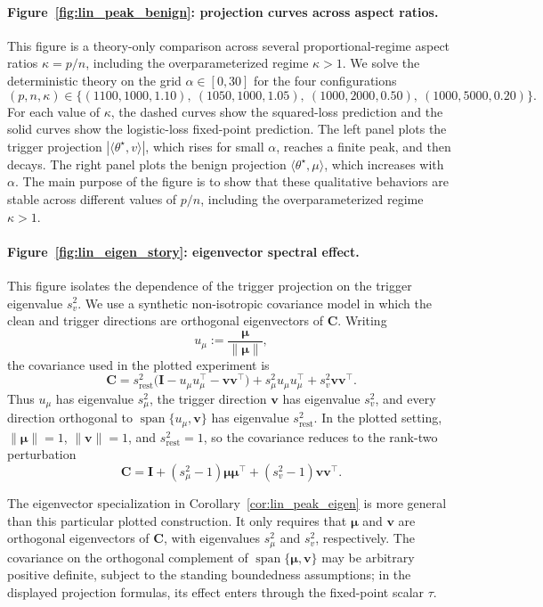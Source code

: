 \documentclass[11pt]{article}
\newcommand{\I}{\mathbf{I}}
\newcommand{\C}{\mathbf{C}}
\newcommand{\bv}{\mathbf{v}}
\newcommand{\bmu}{\boldsymbol{\mu}}
\begin{document}
\paragraph{Figure~\ref{fig:lin_peak_benign}: projection curves across aspect ratios.}
This figure is a theory-only comparison across several proportional-regime
aspect ratios \(\kappa=p/n\), including the overparameterized regime
\(\kappa>1\). We solve the deterministic theory on the grid
\(\alpha\in[0,30]\) for the four configurations
\[
(p,n,\kappa)\in
\{(1100,1000,1.10),\ (1050,1000,1.05),\ (1000,2000,0.50),\
(1000,5000,0.20)\}.
\]
For each value of \(\kappa\), the dashed curves show the squared-loss
prediction and the solid curves show the logistic-loss fixed-point prediction.
The left panel plots the trigger projection
\(|\langle\theta^\star,v\rangle|\), which rises for small \(\alpha\), reaches a
finite peak, and then decays. The right panel plots the benign projection
\(\langle\theta^\star,\mu\rangle\), which increases with \(\alpha\). The main
purpose of the figure is to show that these qualitative behaviors are stable
across different values of \(p/n\), including the overparameterized regime
\(\kappa>1\).

\paragraph{Figure~\ref{fig:lin_eigen_story}: eigenvector spectral effect.}
This figure isolates the dependence of the trigger projection on the trigger
eigenvalue \(s_v^2\). We use a synthetic non-isotropic covariance model in
which the clean and trigger directions are orthogonal eigenvectors of \(\C\).
Writing
\[
u_\mu:=\frac{\bmu}{\|\bmu\|},
\]
the covariance used in the plotted experiment is
\[
\C
=
s_{\mathrm{rest}}^2
\bigl(\I-u_\mu u_\mu^\top-\bv\bv^\top\bigr)
+
s_\mu^2u_\mu u_\mu^\top
+
s_v^2\bv\bv^\top .
\]
Thus \(u_\mu\) has eigenvalue \(s_\mu^2\), the trigger direction \(\bv\) has
eigenvalue \(s_v^2\), and every direction orthogonal to
\(\operatorname{span}\{u_\mu,\bv\}\) has eigenvalue
\(s_{\mathrm{rest}}^2\). In the plotted setting, \(\|\bmu\|=1\),
\(\|\bv\|=1\), and \(s_{\mathrm{rest}}^2=1\), so the covariance reduces to the
rank-two perturbation
\[
\C
=
\I
+
(s_\mu^2-1)\bmu\bmu^\top
+
(s_v^2-1)\bv\bv^\top .
\]

The eigenvector specialization in Corollary~\ref{cor:lin_peak_eigen} is more
general than this particular plotted construction. It only requires that
\(\bmu\) and \(\bv\) are orthogonal eigenvectors of \(\C\), with eigenvalues
\(s_\mu^2\) and \(s_v^2\), respectively. The covariance on the orthogonal
complement of \(\operatorname{span}\{\bmu,\bv\}\) may be arbitrary positive
definite, subject to the standing boundedness assumptions; in the displayed
projection formulas, its effect enters through the fixed-point scalar \(\tau\).
\end{document}
